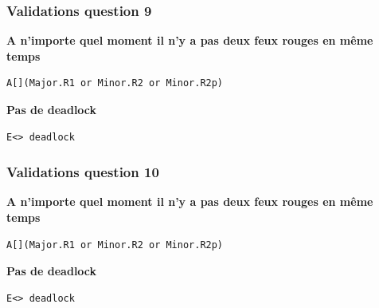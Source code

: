 \documentclass[11pt]{article}
\begin{document}
\subsubsection{Validations question 9}

\textbf{A n'importe quel moment il n'y a pas deux feux rouges en même temps}
\begin{verbatim}
A[](Major.R1 or Minor.R2 or Minor.R2p)
\end{verbatim}

\textbf{Pas de deadlock}
\begin{verbatim}
E<> deadlock
\end{verbatim}

\subsubsection{Validations question 10}

\textbf{A n'importe quel moment il n'y a pas deux feux rouges en même temps}
\begin{verbatim}
A[](Major.R1 or Minor.R2 or Minor.R2p)
\end{verbatim}

\textbf{Pas de deadlock}
\begin{verbatim}
E<> deadlock
\end{verbatim}
\end{document}
